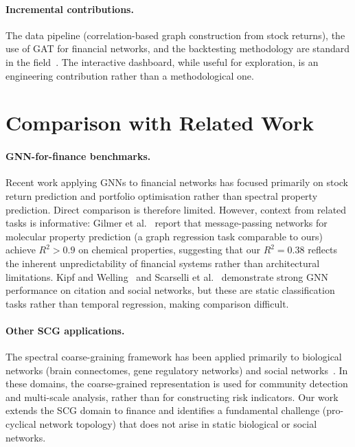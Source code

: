 \paragraph{Incremental contributions.}
The data pipeline (correlation-based graph construction from stock returns), the use of GAT for financial networks, and the backtesting methodology are standard in the field~\cite{mantegna1999introduction,bonanno2004networks,tumminello2005tool}. The interactive dashboard, while useful for exploration, is an engineering contribution rather than a methodological one.


\section{Comparison with Related Work}
\label{sec:comparison}

\paragraph{GNN-for-finance benchmarks.}
Recent work applying GNNs to financial networks has focused primarily on stock return prediction and portfolio optimisation rather than spectral property prediction. Direct comparison is therefore limited. However, context from related tasks is informative: Gilmer et al.~\cite{gilmer2017neural} report that message-passing networks for molecular property prediction (a graph regression task comparable to ours) achieve $R^2 > 0.9$ on chemical properties, suggesting that our $R^2 = 0.38$ reflects the inherent unpredictability of financial systems rather than architectural limitations. Kipf and Welling~\cite{kipf2017semi} and Scarselli et al.~\cite{scarselli2009graph} demonstrate strong GNN performance on citation and social networks, but these are static classification tasks rather than temporal regression, making comparison difficult.

\paragraph{Other SCG applications.}
The spectral coarse-graining framework has been applied primarily to biological networks (brain connectomes, gene regulatory networks) and social networks~\cite{schmidt2024spectral,villegas2023laplacian,lambiotte2014random}. In these domains, the coarse-grained representation is used for community detection and multi-scale analysis, rather than for constructing risk indicators. Our work extends the SCG domain to finance and identifies a fundamental challenge (pro-cyclical network topology) that does not arise in static biological or social networks.

